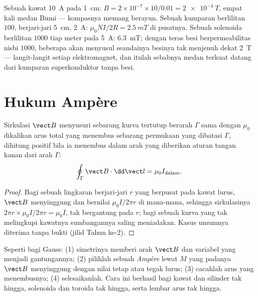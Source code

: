 \begin{example}\label{ex:b1:magnetostatics:orders}
Sebuah kawat \qty{10}{A} pada \qty{1}{cm}: $B = 2 \times 10^{-7} \times 10/0.01 =
\qty{2e-4}{T}$, empat kali medan Bumi --- kompasnya memang berayun.
Sebuah kumparan berlilitan $100$, berjari-jari \qty{5}{cm}, \qty{2}{A}: $\mu_0NI/2R =
\qty{2.5}{mT}$ di pusatnya. Sebuah solenoida berlilitan $1000$ tiap meter pada
\qty{5}{A}: \qty{6.3}{mT}; dengan teras besi berpermeabilitas nisbi
$1000$, beberapa  akan menyusul seandainya besinya tak menjenuh dekat
\qty{2}{T} --- langit-langit setiap elektromagnet, dan itulah sebabnya
medan terkuat datang dari kumparan superkonduktor tanpa besi.
\end{example}

\section{Hukum Ampère}

\begin{theorem}[Ampère]\label{thm:b1:magnetostatics:ampere}
Sirkulasi $\vect B$ menyusuri sebarang kurva tertutup berarah $\Gamma$
sama dengan $\mu_0$ dikalikan arus total yang menembus sebarang permukaan yang
dibatasi $\Gamma$, dihitung positif bila ia menembus dalam arah yang diberikan
aturan tangan kanan dari arah $\Gamma$:
\[
\oint_\Gamma \vect B\cdot\dd\vect l = \mu_0 I_{\text{dalam}} .
\]
\end{theorem}

\begin{proof}
Bagi sebuah lingkaran berjari-jari $r$ yang berpusat pada kawat lurus, $\vect B$
menyinggung dan bernilai $\mu_0I/2\pi r$ di mana-mana, sehingga sirkulasinya
$2\pi r \times \mu_0I/2\pi r = \mu_0I$, tak bergantung pada $r$; bagi sebuah kurva yang tak
melingkupi kawatnya sumbangannya saling meniadakan. Kasus umumnya
diterima tanpa bukti (jilid Tahun ke-2).
\end{proof}

\begin{method}\label{meth:b1:magnetostatics:ampere}
Seperti bagi Gauss: (1) simetrinya memberi arah $\vect B$ dan variabel
yang menjadi gantungannya; (2) pilihlah sebuah \emph{ Ampère} lewat $M$
yang padanya $\vect B$ menyinggung dengan nilai tetap atau
tegak lurus; (3) cacahlah arus yang menembusnya; (4) selesaikanlah. Cara ini berhasil
bagi kawat dan silinder tak hingga, solenoida dan toroida tak hingga, serta
lembar arus tak hingga.
\end{method}

